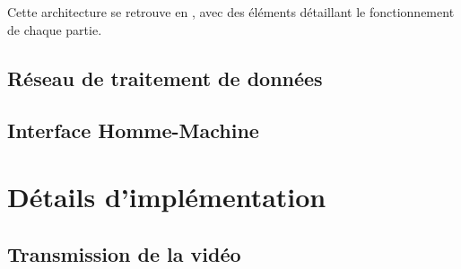 			Cette architecture se retrouve en \todoref, avec des éléments détaillant le fonctionnement de chaque partie.

		\subsection{Réseau de traitement de données}

			
		\subsection{Interface Homme-Machine}
		

	\section{Détails d'implémentation}
	
		\subsection{Transmission de la vidéo}
		
